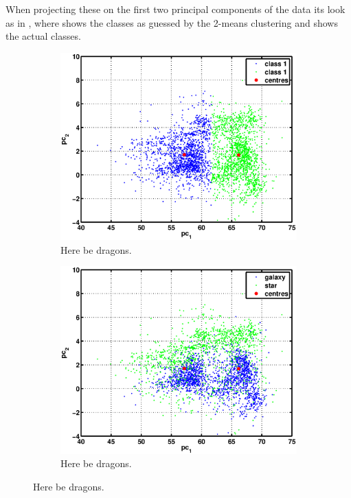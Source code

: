 \documentclass[a4paper, 11pt]{article}
\begin{document}
When projecting these on the first two principal components of the data its look as in , where  shows the classes as guessed by the 2-means clustering and  shows the actual classes.

\begin{figure}[H] %
    \centering
    \begin{subfigure}[b]{0.49\textwidth}
    \includegraphics[width=\textwidth]{figures/question5_1}
        \caption{Here be dragons.}\label{fig:question5_1}
    \end{subfigure}
    \begin{subfigure}[b]{0.49\textwidth}
        \includegraphics[width=\textwidth]{figures/question5_2}
        \caption{Here be dragons.}\label{fig:question5_2}
    \end{subfigure}
    \caption{Here be dragons.}\label{fig:question5}
\end{figure}
\end{document}
